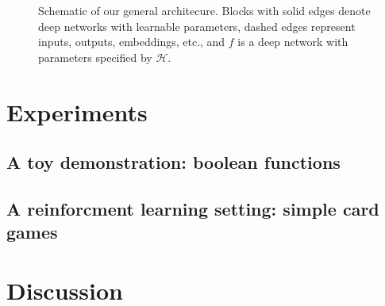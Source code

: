 \documentclass[11pt]{article}
\begin{document}
\begin{figure}
\caption{Schematic of our general architecure. Blocks with solid edges denote deep networks with learnable parameters, dashed edges represent inputs, outputs, embeddings, etc., and $f$ is a deep network with parameters specified by $\mathcal{H}$.} \label{architecture_fig}
\end{figure}

\section{Experiments}

\subsection{A toy demonstration: boolean functions}

\subsection{A reinforcment learning setting: simple card games}


\section{Discussion}
\end{document}

